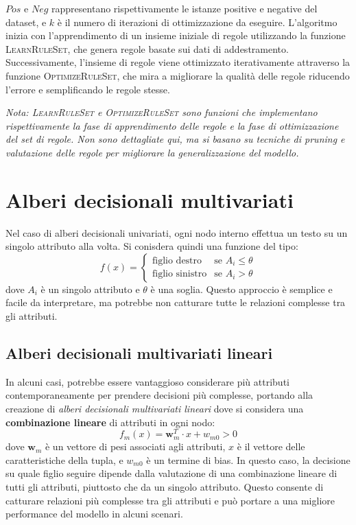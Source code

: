 $Pos$ e $Neg$ rappresentano rispettivamente le istanze positive e negative del dataset, e $k$ è il numero di iterazioni di ottimizzazione da eseguire. L'algoritmo inizia con l'apprendimento di un insieme iniziale di regole utilizzando la funzione \textsc{LearnRuleSet}, che genera regole basate sui dati di addestramento. Successivamente, l'insieme di regole viene ottimizzato iterativamente attraverso la funzione \textsc{OptimizeRuleSet}, che mira a migliorare la qualità delle regole riducendo l'errore e semplificando le regole stesse.

\medskip

\textit{Nota: \textsc{LearnRuleSet} e \textsc{OptimizeRuleSet} sono funzioni che implementano rispettivamente la fase di apprendimento delle regole e la fase di ottimizzazione del set di regole. Non sono dettagliate qui, ma si basano su tecniche di pruning e valutazione delle regole per migliorare la generalizzazione del modello.}

\section{Alberi decisionali multivariati}
Nel caso di alberi decisionali univariati, ogni nodo interno effettua un testo su un singolo attributo alla volta. Si conisdera quindi una funzione del tipo:
\[
f(x) = 
\begin{cases}
\text{figlio destro} & \text{se } A_i \leq \theta \\
\text{figlio sinistro} & \text{se } A_i > \theta
\end{cases}
\]
dove $A_i$ è un singolo attributo e $\theta$ è una soglia. Questo approccio è semplice e facile da interpretare, ma potrebbe non catturare tutte le relazioni complesse tra gli attributi.

\subsection{Alberi decisionali multivariati lineari}
In alcuni casi, potrebbe essere vantaggioso considerare più attributi contemporaneamente per prendere decisioni più complesse, portando alla creazione di \emph{alberi decisionali multivariati lineari} dove si considera una \textbf{combinazione lineare} di attributi in ogni nodo:
\[
f_m(x) = \mathbf{w}_m^T \cdot x + w_{m0} > 0
\]
dove $\mathbf{w}_m$ è un vettore di pesi associati agli attributi, $x$ è il vettore delle caratteristiche della tupla, e $w_{m0}$ è un termine di bias. In questo caso, la decisione su quale figlio seguire dipende dalla valutazione di una combinazione lineare di tutti gli attributi, piuttosto che da un singolo attributo. Questo consente di catturare relazioni più complesse tra gli attributi e può portare a una migliore performance del modello in alcuni scenari.

